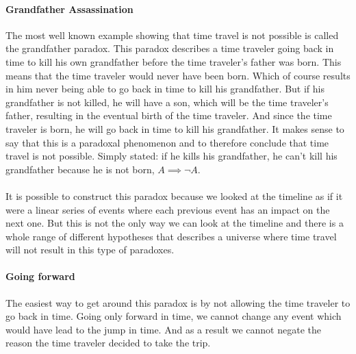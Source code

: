 \paragraph{Grandfather Assassination}
The most well known example showing that time travel is not possible is called the grandfather paradox. This paradox describes a time traveler going back in time to kill his own grandfather before the time traveler's father was born. This  means that the time traveler would never have been born. Which of course results in him never being able to go back in time to kill his grandfather. But if his grandfather is not killed, he will have a son, which will be the time traveler's father, resulting in the eventual birth of the time traveler. And since the time traveler is born, he will go back in time to kill his grandfather. It makes sense to say that this is a paradoxal phenomenon and to therefore conclude that time travel is not possible. Simply stated: if he kills his grandfather, he can't kill his grandfather because he is not born, $A \implies \neg A$.
\paragraph{}
It is possible to construct this paradox because we looked at the timeline  as if it were a linear series of events where each previous event has an impact on the next one. But this is not the only way we can look at the timeline  and there is a whole range of different hypotheses that describes a universe where time travel will not result in this type of paradoxes.

\paragraph{Going forward}
The easiest way to get around this paradox is by not allowing the time traveler to go back in time. Going only forward in time, we cannot change any event which would have lead to the jump in time. And as a result we cannot negate the reason the time traveler decided to take the trip.

